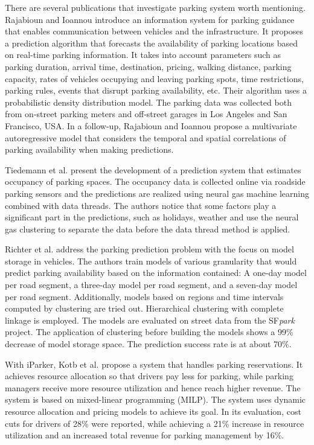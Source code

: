 	There are several publications that investigate parking system worth mentioning. Rajabioun and Ioannou\cite{rajabioun2013} introduce an information system for parking guidance that enables communication between vehicles and the infrastructure. It proposes a prediction algorithm that forecasts the availability of parking locations based on real-time parking information. It takes into account parameters such as parking duration, arrival time, destination, pricing, walking distance, parking capacity, rates of vehicles occupying and leaving parking spots, time restrictions, parking rules, events that disrupt parking availability, etc. Their algorithm uses a probabilistic density distribution model. The parking data was collected both from on-street parking meters and off-street garages in Los Angeles and San Francisco, USA. In a follow-up, Rajabioun and Ioannou\cite{rajabioun2015} propose a multivariate autoregressive model that considers the temporal and spatial correlations of parking availability when making predictions. 
	
	Tiedemann et al.\cite{tiedemann} present the development of a prediction system that estimates occupancy of parking spaces. The occupancy data is collected online via roadside parking sensors and the predictions are realized using neural gas machine learning combined with data threads. The authors notice that some factors play a significant part in the predictions, such as holidays, weather and use the neural gas clustering to separate the data before the data thread method is applied. 
	
	Richter et al.\cite{richter} address the parking prediction problem with the focus on model storage in vehicles. The authors train models of various granularity that would predict parking availability based on the information contained: A one-day model per road segment, a three-day model per road segment, and a seven-day model per road segment. Additionally, models based on regions and time intervals computed by clustering are tried out. Hierarchical clustering with complete linkage is employed. The models are evaluated on street data from the SF\textit{park} project\cite{sfpark_open_data}. The application of clustering before building the models shows a 99\% decrease of model storage space. The prediction success rate is at about 70\%. 
	
	With iParker, Kotb et al.\cite{kotb} propose a system that handles parking reservations. It achieves resource allocation so that drivers pay less for parking, while parking managers receive more resource utilization and hence reach higher revenue. The system is based on mixed-linear programming (MILP). The system uses dynamic resource allocation and pricing models to achieve its goal. In its evaluation, cost cuts for drivers of 28\% were reported, while achieving a 21\% increase in resource utilization and an increased total revenue for parking management by 16\%. 
	
